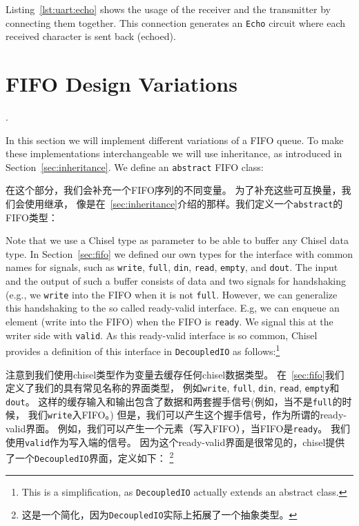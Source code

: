\documentclass[%
    10pt,
    headinclude, footexclude,
    openright, %
    notitlepage,
    cleardoubleempty,
    headsepline,
    pointlessnumbers,
    bibtotoc, idxtotoc,
    ]{scrbook}
\newcommand{\code}[1]{{\small{\texttt{#1}}}}
\newcommand{\codefoot}[1]{{\footnotesize{\texttt{#1}}}}
\begin{document}
{
Listing~\ref{lst:uart:echo} shows the usage of the receiver and the transmitter
by connecting them together. This connection generates an \code{Echo} circuit where each
received character is sent back (echoed).

\section{FIFO Design Variations}
\label{sec:more:fifo}.

In this section we will implement different variations of a FIFO queue.
To make these implementations interchangeable we will use inheritance,
as introduced in Section~\ref{sec:inheritance}. We define an \code{abstract}
FIFO class:

在这个部分，我们会补充一个FIFO序列的不同变量。
为了补充这些可互换量，我们会使用继承，
像是在~\ref{sec:inheritance}介绍的那样。我们定义一个\code{abstract}的FIFO类型：


\noindent Note that we use a Chisel type as parameter to be able to buffer
any Chisel data type.
In Section~\ref{sec:fifo} we defined our own types for the interface with common
names for signals, such as \code{write}, \code{full}, \code{din}, \code{read},
\code{empty}, and \code{dout}. The input and the output of such a buffer consists
of data and two signals for handshaking (e.g., we \code{write} into the FIFO when
it is not \code{full}.
However, we can generalize this handshaking to the so called ready-valid interface.
E.g, we can enqueue an element (write into the FIFO) when the FIFO is \code{ready}.
We signal this at the writer side with \code{valid}.
As this ready-valid interface is so common, Chisel provides a definition
of this interface in \code{DecoupledIO} as follows:\footnote{This is a simplification,
as \codefoot{DecoupledIO} actually extends an abstract class.}

\noindent 注意到我们使用chisel类型作为变量去缓存任何chisel数据类型。
在~\ref{sec:fifo}我们定义了我们的具有常见名称的界面类型，
例如\code{write}, \code{full}, \code{din}, \code{read}, \code{empty}和\code{dout}。
这样的缓存输入和输出包含了数据和两套握手信号(例如，当不是\code{full}的时候， 我们\code{write}入FIFO。)
但是，我们可以产生这个握手信号，作为所谓的ready-valid界面。
例如，我们可以产生一个元素（写入FIFO），当FIFO是\code{ready}。
我们使用\code{valid}作为写入端的信号。
因为这个ready-valid界面是很常见的，chisel提供了一个\code{DecoupledIO}界面，定义如下：
\footnote{这是一个简化，因为\codefoot{DecoupledIO}实际上拓展了一个抽象类型。}

}
\end{document}

